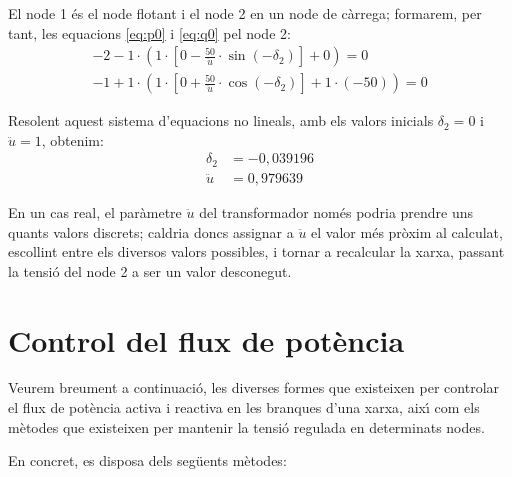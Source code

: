 \begin{exemple}
El node 1 \'{e}s el node flotant i el node 2 en un node de c\`{a}rrega; formarem, per tant,  les equacions \eqref{eq:p0} i \eqref{eq:q0} pel node 2:
\begin{align*}
-2 - 1 \cdot\left( 1 \cdot\left[ 0 -\frac{50}{\ddot{u}} \cdot\sin(-\delta_2) \right]  + 0 \right)  = 0   \\[1.5ex]
-1 + 1 \cdot\left( 1 \cdot\left[0 + \frac{50}{\ddot{u}} \cdot\cos(-\delta_2) \right]  +
1\cdot (-50) \right)  = 0
\end{align*}

Resolent aquest sistema d'equacions no lineals, amb els valors inicials $\delta_2=0$ i
$\ddot{u}=1$, obtenim:
\begin{align*}
   \delta_2 &= -0{,}039196 \\[1ex]
   \ddot{u} & =0{,}979639
\end{align*}

En un cas real, el par\`{a}metre $\ddot{u}$ del transformador nom\'{e}s podria  prendre uns quants
valors discrets; caldria doncs assignar a $\ddot{u}$ el valor m\'{e}s pr\`{o}xim al calculat,
escollint entre els diversos valors possibles, i tornar a recalcular la xarxa, passant la
tensi\'{o} del node 2 a ser un valor desconegut.

\end{exemple}

\section{Control del flux de pot\`{e}ncia} 

Veurem breument a continuaci\'{o}, les diverses formes que existeixen
per controlar el flux de pot\`{e}ncia activa i reactiva en les branques
d'una xarxa, aix\'{\i} com els m\`{e}todes que existeixen per mantenir la
tensi\'{o} regulada en determinats nodes.

En concret, es disposa dels seg\"{u}ents m\`{e}todes:

